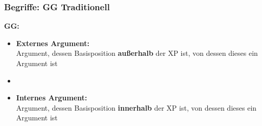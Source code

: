 \begin{frame}
\frametitle{Begriffe: GG \vs Traditionell}

	\begin{minipage}[b]{0.47\textwidth}
		\footnotesize
	\textbf{GG:}
		\begin{itemize}
		\item \textbf{Externes Argument:}\\
		Argument, dessen Basisposition \textbf{außerhalb} der XP ist, von dessen  dieses ein Argument ist
		\item[]
		\item \alert{\textbf{Internes Argument:}}\\
		Argument, dessen Basisposition \textbf{innerhalb} der XP ist, von dessen  dieses ein Argument ist
		\end{itemize}	
  	\end{minipage}  
	\begin{minipage}[b]{0.48\textwidth}
		\begin{figure}
	\centering
	\end{figure}	
  	\end{minipage}

\end{frame}



